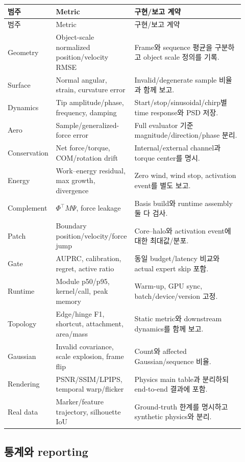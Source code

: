 \documentclass[10pt,a4paper]{article}
\begin{document}
\small
\begin{longtable}{L{0.17\linewidth}L{0.29\linewidth}L{0.46\linewidth}}
\toprule
범주 & Metric & 구현/보고 계약 \\
\midrule
\endfirsthead
\toprule
범주 & Metric & 구현/보고 계약 \\
\midrule
\endhead
Geometry & Object-scale normalized position/velocity RMSE & Frame와 sequence 평균을 구분하고 object scale 정의를 기록. \\
Surface & Normal angular, strain, curvature error & Invalid/degenerate sample 비율과 함께 보고. \\
Dynamics & Tip amplitude/phase, frequency, damping & Start/stop/sinusoidal/chirp별 time response와 PSD 저장. \\
Aero & Sample/generalized-force error & Full evaluator 기준 magnitude/direction/phase 분리. \\
Conservation & Net force/torque, COM/rotation drift & Internal/external channel과 torque center를 명시. \\
Energy & Work--energy residual, max growth, divergence & Zero wind, wind stop, activation event를 별도 보고. \\
Complement & \(\Phi^\top M\Psi\), force leakage & Basis build와 runtime assembly 둘 다 검사. \\
Patch & Boundary position/velocity/force jump & Core--halo와 activation event에 대한 최대값/분포. \\
Gate & AUPRC, calibration, regret, active ratio & 동일 budget/latency 비교와 actual expert skip 포함. \\
Runtime & Module p50/p95, kernel/call, peak memory & Warm-up, GPU sync, batch/device/version 고정. \\
Topology & Edge/hinge F1, shortcut, attachment, area/mass & Static metric와 downstream dynamics를 함께 보고. \\
Gaussian & Invalid covariance, scale explosion, frame flip & Count와 affected Gaussian/sequence 비율. \\
Rendering & PSNR/SSIM/LPIPS, temporal warp/flicker & Physics main table과 분리하되 end-to-end 결과에 포함. \\
Real data & Marker/feature trajectory, silhouette IoU & Ground-truth 한계를 명시하고 synthetic physics와 분리. \\
\bottomrule
\end{longtable}
\normalsize

\subsection{통계와 reporting}
\end{document}
